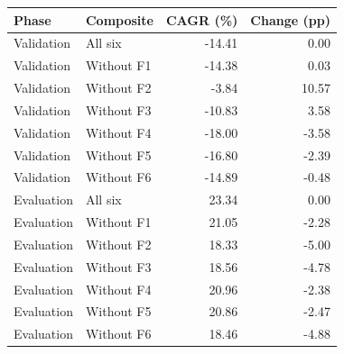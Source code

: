 \begin{tabular}{llrr}
\toprule
Phase & Composite & CAGR (\%) & Change (pp) \\
\midrule
Validation & All six & -14.41 & 0.00 \\
Validation & Without F1 & -14.38 & 0.03 \\
Validation & Without F2 & -3.84 & 10.57 \\
Validation & Without F3 & -10.83 & 3.58 \\
Validation & Without F4 & -18.00 & -3.58 \\
Validation & Without F5 & -16.80 & -2.39 \\
Validation & Without F6 & -14.89 & -0.48 \\
Evaluation & All six & 23.34 & 0.00 \\
Evaluation & Without F1 & 21.05 & -2.28 \\
Evaluation & Without F2 & 18.33 & -5.00 \\
Evaluation & Without F3 & 18.56 & -4.78 \\
Evaluation & Without F4 & 20.96 & -2.38 \\
Evaluation & Without F5 & 20.86 & -2.47 \\
Evaluation & Without F6 & 18.46 & -4.88 \\
\bottomrule
\end{tabular}
